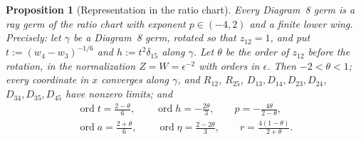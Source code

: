 \documentclass[11pt]{amsart}
\newtheorem{proposition}[theorem]{Proposition}
\theoremstyle{definition}
\theoremstyle{remark}
\newcommand{\ord}{\operatorname{ord}}
\begin{document}
\begin{proposition}[Representation in the ratio chart]\label{prop:d8-cover}
Every Diagram~8 germ is a ray germ of the ratio chart with exponent $p\in(-4,2)$ and a finite
lower wing.  Precisely: let $\gamma$ be a Diagram~8 germ, rotated so that $z_{12}=1$, and put
$t:=(w_4-w_3)^{-1/6}$ and $h:=t^2\delta_{15}$ along $\gamma$.  Let $\theta$ be the order of
$z_{12}$ before the rotation, in the normalization $Z=W=\epsilon^{-2}$ with orders in $\epsilon$.
Then $-2<\theta<1$; every coordinate in $x$ converges along $\gamma$, and $R_{12}$, $R_{25}$,
$D_{13},D_{14},D_{23},D_{24}$, $D_{34},D_{35},D_{45}$ have nonzero limits; and
\begin{gather*}
  \ord t=\tfrac{2-\theta}6,\qquad \ord h=-\tfrac{2\theta}3,\qquad
  p=-\tfrac{4\theta}{2-\theta},\\
  \ord a=\tfrac{2+\theta}6,\qquad \ord\eta=\tfrac{2-2\theta}3,\qquad
  r=\tfrac{4(1-\theta)}{2+\theta}.
\end{gather*}
\end{proposition}
\end{document}

